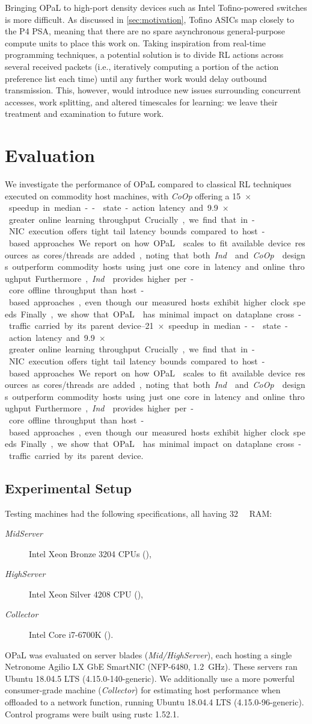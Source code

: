 \documentclass[
sigconf,natbib=false
]{acmart}
\newcommand{\approachshort}{OPaL}
\newcommand{\Coopfw}{\emph{CoOp}}
\newcommand{\Indfw}{\emph{Ind}}
\begin{document}
Bringing \approachshort{} to high-port density devices such as Intel Tofino-powered switches is more difficult.
As discussed in \cref{sec:motivation}, Tofino ASICs map closely to the P4 PSA, meaning that there are no spare asynchronous general-purpose compute units to place this work on.
Taking inspiration from real-time programming techniques, a potential solution is to divide RL actions across several received packets (i.e., iteratively computing a portion of the action preference list each time) until any further work would delay outbound transmission.
This, however, would introduce new issues surrounding concurrent accesses, work splitting, and altered timescales for learning: we leave their treatment and examination to future work.

\section{Evaluation}\label{sec:evaluation}
We investigate the performance of \approachshort{} compared to classical RL techniques executed on commodity host machines, with \Coopfw{} offering a \SIrange{15}{21}{$\times$} speedup in median-- state-action latency and \SI{9.9}{$\times$} greater online learning throughput.
Crucially, we find that in-NIC execution offers tight tail latency bounds compared to host-based approaches.
We report on how \approachshort{} scales to fit available device resources as cores/threads are added, noting that both \Indfw{} and \Coopfw{} designs outperform commodity hosts using just one core in latency and online throughput. 
Furthermore, \Indfw{} provides higher per-core offline throughput than host-based approaches, even though our measured hosts exhibit higher clock speeds.
Finally, we show that \approachshort{} has minimal impact on dataplane cross-traffic carried by its parent device.

\subsection{Experimental Setup}\label{sec:experimental-setup}
Testing machines had the following specifications, all having \SI{32}{\gibi\byte} RAM:
\begin{description}
	\item[\emph{MidServer}] Intel Xeon Bronze 3204 CPUs (),
	\item[\emph{HighServer}] Intel Xeon Silver 4208 CPU (),
	\item[\emph{Collector}] Intel Core i7-6700K ().
\end{description}
\approachshort{} was evaluated on server blades (\emph{Mid/HighServer}), each hosting a single Netronome Agilio LX GbE SmartNIC (NFP-6480, \SI{1.2}{\giga\hertz}).
These servers ran Ubuntu 18.04.5 LTS (4.15.0-140-generic).
We additionally use a more powerful consumer-grade machine (\emph{Collector}) for estimating host performance when offloaded to a network function, running Ubuntu 18.04.4 LTS (4.15.0-96-generic).
Control programs were built using rustc 1.52.1.
\end{document}
